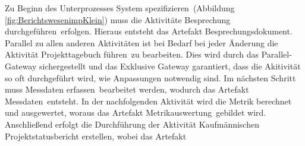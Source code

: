 Zu Beginn des Unterprozesses \grqq System spezifizieren\grqq \  (Abbildung \ref{fig:BerichtswesenimpKlein}) muss die Aktivitäte \grqq Besprechung durchgeführen\grqq \  erfolgen. Hieraus entsteht das Artefakt \grqq Besprechungsdokument\grqq.
Parallel zu allen anderen Aktivitäten ist bei Bedarf bei jeder Änderung die Aktivität \grqq Projekttagebuch führen\grqq \ zu bearbeiten. Dies wird durch das Parallel-Gateway sichergestellt und das Exklusive Gateway garantiert, dass die Akitivität so oft durchgeführt wird, wie Anpassungen notwendig sind. 
Im nächsten Schritt muss \grqq Messdaten erfassen\grqq \ bearbeitet werden, wodurch das Artefakt \grqq Messdaten\grqq \ entsteht.
In der nachfolgenden Aktivität wird die \grqq Metrik berechnet und ausgewertet\grqq, woraus das Artefakt \grqq Metrikauswertung\grqq \ gebildet wird.
Anschließend erfolgt die Durchführung der Aktivität \grqq Kaufmännischen Projektstatusbericht erstellen\grqq, wobei das Artefakt 
